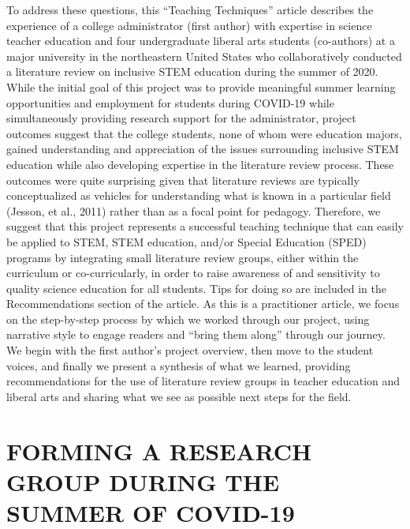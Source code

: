 \documentclass[11.5pt]{sig-alternate}
\begin{document}
\begin{large}
To address these questions, this “Teaching Techniques” article describes the experience of a college administrator (first author) with expertise in science teacher education and four undergraduate liberal arts students (co-authors) at a major university in the northeastern United States who collaboratively conducted a literature review on inclusive STEM education during the summer of 2020.  While the initial goal of this project was to provide meaningful summer learning opportunities and employment for students during COVID-19 while simultaneously providing research support for the administrator, project outcomes suggest that the college students, none of whom were education majors, gained understanding and appreciation of the issues surrounding inclusive STEM education while also developing expertise in the literature review process.  These outcomes were quite surprising given that literature reviews are typically conceptualized as vehicles for understanding what is known in a particular field (Jesson, et al., 2011) rather than as a focal point for pedagogy. Therefore, we suggest that this project represents a successful teaching technique that can easily be applied to STEM, STEM education, and/or Special Education (SPED) programs by integrating small literature review groups, either within the curriculum or co-curricularly, in order to raise awareness of and sensitivity to quality science education for all students. Tips for doing so are included in the Recommendations section of the article. As this is a practitioner article, we focus on the step-by-step process by which we worked through our project, using narrative style to engage readers and “bring them along” through our journey.  We begin with the first author’s project overview, then move to the student voices, and finally we present a synthesis of what we learned, providing recommendations for the use of literature review groups in teacher education and liberal arts and sharing what we see as possible next steps for the field. 

\section*{FORMING A RESEARCH GROUP DURING THE SUMMER OF COVID-19}


\end{large}
\end{document}
